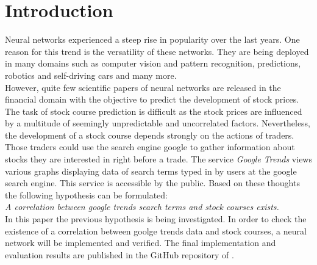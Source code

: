 \section{Introduction}
\label{sec:introduction}
Neural networks experienced a steep rise in popularity over the last years. One reason for this trend is the versatility of these networks. They are being deployed in many domains such as computer vision and pattern recognition, predictions, robotics and self-driving cars and many more. 
\\
However, quite few scientific papers of neural networks are released in the financial domain with the objective to predict the development of stock prices. The task of stock course prediction is difficult as the stock prices are influenced by a multitude of seemingly unpredictable and uncorrelated factors. Nevertheless, the development of a stock course depends strongly on the actions of traders. Those traders could use the search engine google to gather information about stocks they are interested in right before a trade. The service \textit{Google Trends} views various graphs displaying data of search terms typed in by users at the google search engine. This service is accessible by the public. Based on these thoughts the following hypothesis can be formulated: 
\\
\textit{A correlation between google trends search terms and stock courses exists. } 
\\
In this paper the previous hypothesis is being investigated. In order to check the existence of a correlation between goolge trends data and stock courses, a neural network will be implemented and verified. The final implementation and evaluation results are published in the GitHub repository of \cite{githubrepo}. 